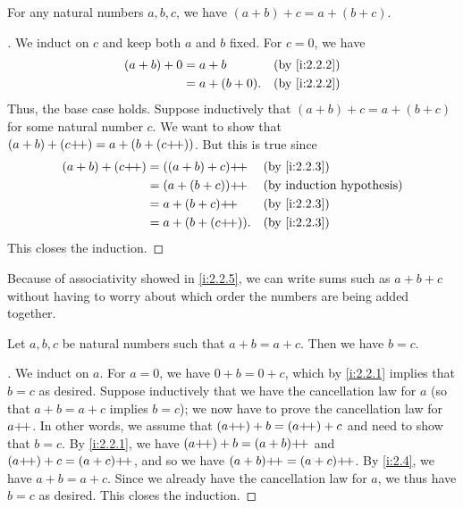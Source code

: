 \begin{prop}\label{i:2.2.5}
  For any natural numbers \(a, b, c\), we have \((a + b) + c = a + (b + c)\).
\end{prop}

\begin{proof}[]
  We induct on \(c\) and keep both \(a\) and \(b\) fixed.
  For \(c = 0\), we have
  \begin{align*}
    (a + b) + 0 & = a + b        &  & \by{i:2.2.2} \\
                & = a + (b + 0). &  & \by{i:2.2.2}
  \end{align*}
  Thus, the base case holds.
  Suppose inductively that \((a + b) + c = a + (b + c)\) for some natural number \(c\).
  We want to show that \((a + b) + (c{+}\!{+}) = a + (b + (c{+}\!{+}))\).
  But this is true since
  \begin{align*}
    (a + b) + (c\pp) & = ((a + b) + c)\pp  &  & \by{i:2.2.3} \\
                     & = (a + (b + c))\pp  &  & \byIH        \\
                     & = a + (b + c)\pp    &  & \by{i:2.2.3} \\
                     & = a + (b + (c\pp)). &  & \by{i:2.2.3}
  \end{align*}
  This closes the induction.
\end{proof}

\begin{note}
  Because of associativity showed in \cref{i:2.2.5}, we can write sums such as \(a + b + c\) without having to worry about which order the numbers are being added together.
\end{note}

\begin{prop}\label{i:2.2.6}
  Let \(a, b, c\) be natural numbers such that \(a + b = a + c\).
  Then we have \(b = c\).
\end{prop}

\begin{proof}[]
  We induct on \(a\).
  For \(a = 0\), we have \(0 + b = 0 + c\), which by \cref{i:2.2.1} implies that \(b = c\) as desired.
  Suppose inductively that we have the cancellation law for \(a\) (so that \(a + b = a + c\) implies \(b = c\));
  we now have to prove the cancellation law for \(a{+}\!{+}\).
  In other words, we assume that \((a{+}\!{+}) + b = (a{+}\!{+}) + c\) and need to show that \(b = c\).
  By \cref{i:2.2.1}, we have \((a{+}\!{+}) + b = (a + b){+}\!{+}\) and \((a{+}\!{+}) + c = (a + c){+}\!{+}\), and so we have \((a + b){+}\!{+} = (a + c){+}\!{+}\).
  By \cref{i:2.4}, we have \(a + b = a + c\).
  Since we already have the cancellation law for \(a\), we thus have \(b = c\) as desired.
  This closes the induction.
\end{proof}

